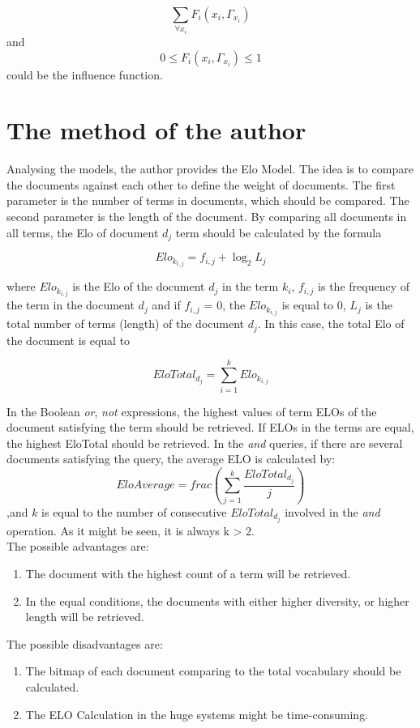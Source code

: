 \documentclass[paper=8.27in:11.69in, 12pt]{scrartcl}
\begin{document}
\[ \sum_{\forall x_{i}} F_{i} \left (x_{i}, \Gamma_{x_{i}}  \right ) \]
and
\[ 0 \leq F_{i} \left (x_{i}, \Gamma_{x_{i}}  \right ) \leq 1 \]
could be the influence function.

\section{The method of the author}

Analysing the models, the author provides the Elo Model. The idea is to compare the documents against each other to define the weight of documents. The first parameter is the number of terms in documents, which should be compared. The second parameter is the length of the document. By comparing all documents in all terms, the Elo of document \(d_{j}\) term should be calculated by the formula

\[ Elo_{k_{i, j}} = f_{i, j} + \log_{2} L_{j} \]

where \(Elo_{k_{i, j}}\) is the Elo of the document \(d_{j}\) in the term \(k_{i}\), \(f_{i, j}\) is the frequency of the term in the  document \(d_{j}\) and if \(f_{i, j}\) = 0, the  \(Elo_{k_{i, j}}\) is equal to 0, \(L_{j}\) is the total number of terms (length) of the document \(d_{j}\). In this case, the total Elo of the document is equal to

\[ EloTotal_{d_{j}} = \sum_{i=1}^{k} Elo_{k_{i, j}} \]

In the Boolean \textit{or}, \textit{not} expressions, the highest values of term ELOs of the document satisfying the term should be retrieved. If ELOs in the terms are equal, the highest EloTotal should be retrieved. In the \textit{and} queries, if there are several documents satisfying the query, the average ELO is calculated by:\\

\[ EloAverage = frac(\sum_{j=1}^{k} \frac{EloTotal_{d_{j}}}{j}) \],and \(k\) is equal to the number of consecutive \(EloTotal_{d_{j}}\) involved in the \textit{and} operation. As it might be seen, it is always k > 2.\\
\hfill \break
\hfill \break
\hfill \break
The possible advantages are:

\begin{enumerate}

\item The document with the highest count of a term will be retrieved.

\item In the equal conditions, the documents with either higher diversity, or higher length will be retrieved.

\end{enumerate}

The possible disadvantages are:

\begin{enumerate}

\item The bitmap of each document comparing to the total vocabulary should be calculated.

\item The ELO Calculation in the huge systems might be time-consuming.

\end{enumerate}



\end{document}
